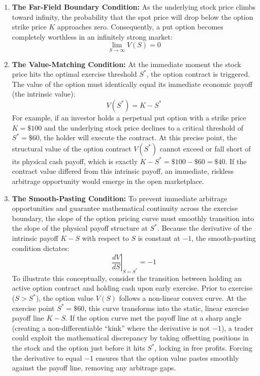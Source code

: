 \documentclass[12pt]{article}
\theoremstyle{definition}
\numberwithin{equation}{section}
\begin{document}
    
\begin{enumerate}[1.]
    \item \textbf{The Far-Field Boundary Condition:} As the underlying stock price climbs toward infinity, the probability that the spot price will drop below the option strike price $K$ approaches zero. Consequently, a put option becomes completely worthless in an infinitely strong market:
    \begin{equation}\label{eq:bc_farfield}
    \lim_{S \to \infty} V(S) = 0
    \end{equation}
    
    \item \textbf{The Value-Matching Condition:} At the immediate moment the stock price hits the optimal exercise threshold $S^*$, 
    the option contract is triggered. The value of the option must identically equal 
    its immediate economic payoff (the intrinsic value):
    \begin{equation}\label{eq:bc_valuematching}
    V(S^*) = K - S^*
    \end{equation}
    For example, if an investor holds a perpetual put option with a strike price $K = \$100$ 
    and the underlying stock price declines to a critical threshold of $S^* = \$60$, 
    the holder will execute the contract. At this precise point, the structural value of the 
    option contract $V(S^*)$ cannot exceed or fall short of its physical cash payoff, 
    which is exactly $K - S^* = \$100 - \$60 = \$40$. If the contract value differed from this 
    intrinsic payoff, an immediate, riskless arbitrage opportunity would emerge in the open marketplace.
    
    \item \textbf{The Smooth-Pasting Condition:} To prevent immediate arbitrage opportunities 
    and guarantee mathematical continuity across the exercise boundary, the slope of the 
    option pricing curve must smoothly transition into the slope of the physical payoff 
    structure at $S^*$. Because the derivative of the intrinsic payoff $K - S$ with respect 
    to $S$ is constant at $-1$, the smooth-pasting condition dictates:
    \begin{equation}\label{eq:bc_smoothpasting}
    \left. \frac{dV}{dS} \right|_{S=S^*} = -1
    \end{equation}
    To illustrate this conceptually, consider the transition between holding an active 
    option contract and holding cash upon early exercise. Prior to exercise ($S > S^*$), 
    the option value $V(S)$ follows a non-linear convex curve. At the exercise 
    point $S^* = \$60$, this curve transforms into the static, linear exercise payoff 
    line $K - S$. If the option curve met the payoff line at a sharp angle 
    (creating a non-differentiable ``kink'' where the derivative is not $-1$),
    a trader could exploit the mathematical discrepancy by taking offsetting positions 
    in the stock and the option just before it hits $S^*$, locking in free profits.
    Forcing the derivative to equal $-1$ ensures that the option value pastes smoothly against the payoff line, 
    removing any arbitrage gaps.
\end{enumerate}
\end{document}
